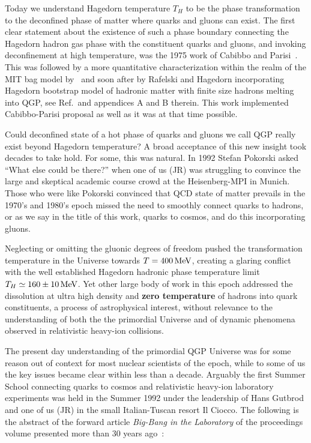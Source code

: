Today we understand Hagedorn temperature $T_H$ to be the phase transformation to the deconfined phase of matter where quarks and gluons can exist. The first clear statement about the existence of such a phase boundary connecting the Hagedorn hadron gas phase with the constituent quarks and gluons, and invoking deconfinement at high temperature, was the 1975 work of Cabibbo and Parisi~\cite{Cabibbo:1975ig}. This was followed by a more quantitative characterization within the realm of the MIT bag model by~\cite{Chin:1978gj} and soon after by Rafelski and Hagedorn incorporating Hagedorn bootstrap model of hadronic matter with finite size hadrons melting into QGP, see Ref.\,\cite{Rafelski:2015cxa} and appendices A and B therein. This work implemented Cabibbo-Parisi proposal as well as it was at that time possible.

Could deconfined state of a hot phase of quarks and gluons we call QGP really exist beyond Hagedorn temperature? A broad acceptance of this new insight took decades to take hold. For some, this was natural. In 1992 Stefan Pokorski asked ``What else could be there?'' when one of us (JR) was struggling to convince the large and skeptical academic course crowd at the Heisenberg-MPI in Munich. Those who were like Pokorski convinced that QCD state of matter prevails in the 1970's and 1980's epoch missed the need to smoothly connect quarks to hadrons, or as we say in the title of this work, quarks to cosmos, and do this incorporating gluons. 

Neglecting or omitting the gluonic degrees of freedom pushed the transformation temperature in the Universe towards $T=400\text{\,MeV}$, creating a glaring conflict with the well established Hagedorn hadronic phase temperature limit $T_H\simeq 160\pm 10\text{\,MeV}$. Yet other large body of work in this epoch addressed the dissolution at ultra high density and {\bf zero temperature} of hadrons into quark constituents, a process of astrophysical interest, without relevance to the understanding of both the the primordial Universe and of dynamic phenomena observed in relativistic heavy-ion collisions.

The present day understanding of the primordial QGP Universe was for some reason out of context for most nuclear scientists of the epoch, while to some of us the key issues became clear within less than a decade. Arguably the first Summer School connecting quarks to cosmos and relativistic heavy-ion laboratory experiments was held in the Summer 1992 under the leadership of Hans Gutbrod and one of us (JR) in the small Italian-Tuscan resort Il Ciocco. The following is the abstract of the forward article {\it Big-Bang in the Laboratory} of the proceedings volume presented more than 30 years ago~\cite{Gutbrod1993}: 

